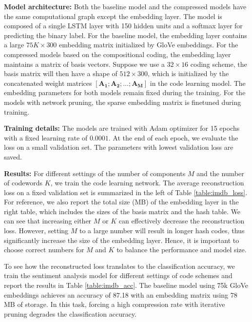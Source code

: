 \documentclass{article} %
\begin{document}
{\bf Model architecture:} \: Both the baseline model and the compressed models have the same computational graph except the embedding layer. The model is composed of a single LSTM layer with 150 hidden units and a softmax layer for predicting the binary label. For the baseline model, the embedding layer contains a large $75K \times 300$ embedding matrix initialized by GloVe embeddings. For the compressed models based on the compositional coding, the embedding layer maintains a matrix of basis vectors. Suppose we use a $32 \times 16$ coding scheme, the basis matrix will then have a shape of $512 \times 300$, which is initialized by the concatenated weight matrices $[\bm{A_1};\bm{A_2};...;\bm{A_M}]$ in the code learning model. The embedding parameters for both models remain fixed during the training. For the models with network pruning, the sparse embedding matrix is finetuned during training.

{\bf Training details:} \: The models are trained with Adam optimizer for 15 epochs with a fixed learning rate of $0.0001$. At the end of each epoch, we evaluate the loss on a small validation set. The parameters with lowest validation loss are saved.

{\bf Results:} \: For different settings of the number of components $M$ and the number of codewords $K$, we train the code learning network. The average reconstruction loss on a fixed validation set is summarized in the left of Table \ref{table:imdb_loss}. For reference, we also report the total size (MB) of the embedding layer in the right table, which includes the sizes of the basis matrix and the hash table. We can see that increasing either $M$ or $K$ can effectively decrease the reconstruction loss. However, setting $M$ to a large number will result in longer hash codes, thus significantly increase the size of the embedding layer. Hence, it is important to choose correct numbers for $M$ and $K$ to balance the performance and model size.


To see how the reconstructed loss translates to the classification accuracy, we train the sentiment analysis model for different settings of code schemes and report the results in Table \ref{table:imdb_acc}. The baseline model using 75k GloVe embeddings achieves an accuracy of 87.18 with an embedding matrix using 78 MB of storage. In this task, forcing a high compression rate with iterative pruning degrades the classification accuracy.
\end{document}
